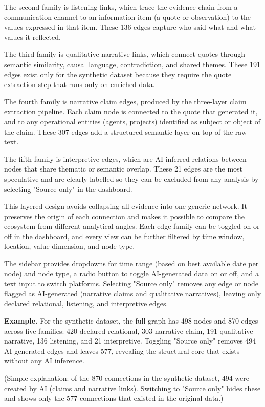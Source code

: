 \documentclass[11pt,a4paper]{article}
\begin{document}
The second family is listening links, which trace the evidence chain
from a communication channel to an information item (a quote or
observation) to the values expressed in that item. These 136 edges
capture who said what and what values it reflected.

The third family is qualitative narrative links, which connect quotes
through semantic similarity, causal language, contradiction, and shared
themes. These 191 edges exist only for the synthetic dataset because
they require the quote extraction step that runs only on enriched data.

The fourth family is narrative claim edges, produced by the three-layer
claim extraction pipeline. Each claim node is connected to the quote
that generated it, and to any operational entities (agents, projects)
identified as subject or object of the claim. These 307 edges add a
structured semantic layer on top of the raw text.

The fifth family is interpretive edges, which are AI-inferred relations
between nodes that share thematic or semantic overlap. These 21 edges
are the most speculative and are clearly labelled so they can be excluded
from any analysis by selecting "Source only" in the dashboard.

This layered design avoids collapsing all evidence into one generic
network. It preserves the origin of each connection and makes it
possible to compare the ecosystem from different analytical angles. Each
edge family can be toggled on or off in the dashboard, and every view
can be further filtered by time window, location, value dimension, and
node type.

The sidebar provides dropdowns for time range (based on best available
date per node) and node type, a radio button to toggle AI-generated data
on or off, and a text input to switch platforms. Selecting "Source only"
removes any edge or node flagged as AI-generated (narrative claims and
qualitative narratives), leaving only declared relational, listening,
and interpretive edges.

\textbf{Example.} For the synthetic dataset, the full graph has 498 nodes and
870 edges across five families: 420 declared relational, 303 narrative
claim, 191 qualitative narrative, 136 listening, and 21 interpretive.
Toggling "Source only" removes 494 AI-generated edges and leaves 577,
revealing the structural core that exists without any AI inference.

(Simple explanation: of the 870 connections in the synthetic dataset,
494 were created by AI (claims and narrative links). Switching to
"Source only" hides these and shows only the 577 connections that
existed in the original data.)
\end{document}
